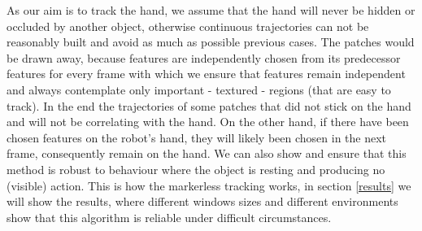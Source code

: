 As our aim is to track the hand, we assume that the hand will never be hidden or occluded by another object, otherwise continuous trajectories can not be reasonably built and avoid as much as possible previous cases.  The patches would be drawn away, because features are independently chosen from its predecessor features for every frame with which we ensure that features remain independent and always contemplate only important - textured - regions (that are easy to track). In the end the trajectories of some patches that did not stick on the hand and will not be correlating with the hand. On the other hand, if there have been chosen features on the robot's hand, they will likely been chosen in the next frame, consequently remain on the hand. We can also show and ensure that this method is robust to behaviour where the object is resting and producing no (visible) action. This is how the markerless tracking works, in section \ref{results} we will show the results, where different windows sizes and different environments show that this algorithm is reliable under difficult circumstances. 

